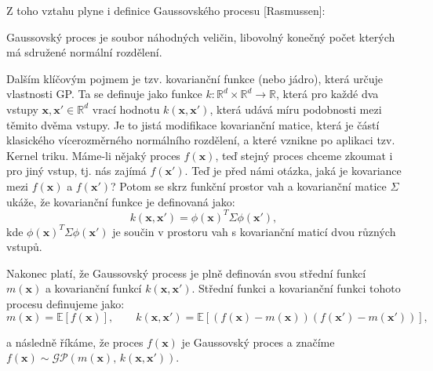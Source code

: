 Z toho vztahu plyne i definice Gaussovského procesu [Rasmussen]:
\begin{definition}
  Gaussovský proces je soubor náhodných veličin, libovolný konečný počet kterých má sdružené normální rozdělení.
\end{definition}

Dalším klíčovým pojmem je tzv. kovarianční funkce (nebo jádro), která určuje vlastnosti GP.
Ta se definuje jako funkce $k: \mathbb{R}^d \times \mathbb{R}^d \to \mathbb{R}$, která pro každé dva vstupy $\mathbf{x}, \mathbf{x'} \in \mathbb{R}^d$ vrací hodnotu $k(\mathbf{x}, \mathbf{x'})$, která udává míru podobnosti mezi těmito dvěma vstupy.
Je to jistá modifikace kovarianční matice, která je částí klasického vícerozměrného normálního rozdělení, a které vznikne po aplikaci tzv. Kernel triku.
Máme-li nějaký proces $f(\mathbf{x})$, teď stejný proces chceme zkoumat i pro jiný vstup, tj. nás zajímá $f(\mathbf{x'})$.
Teď je před námi otázka, jaká je kovariance mezi $f(\mathbf{x})$ a $f(\mathbf{x'})$?
Potom se skrz funkční prostor vah a kovarianční matice $\Sigma$ ukáže, že kovarianční funkce je definovaná jako:
\begin{equation}
  k(\mathbf{x}, \mathbf{x'}) = \phi(\mathbf{x})^T \Sigma \phi(\mathbf{x'}),
\end{equation}
kde $\phi(\mathbf{x})^T \Sigma \phi(\mathbf{x'})$ je součin v prostoru vah s kovarianční maticí dvou různých vstupů.

Nakonec platí, že Gaussovský process je plně definován svou střední funkcí $m(\mathbf{x})$ a kovarianční funkcí $k(\mathbf{x}, \mathbf{x'})$.
Střední funkci a kovarianční funkci tohoto procesu definujeme jako:
\begin{equation}
  m(\mathbf{x}) = \mathbb{E}[f(\mathbf{x})],\qquad
  k(\mathbf{x}, \mathbf{x'}) = \mathbb{E}[(f(\mathbf{x}) - m(\mathbf{x}))(f(\mathbf{x'}) - m(\mathbf{x'}))],
\end{equation}

a následně říkáme, že proces $f(\mathbf{x})$ je Gaussovský proces a značíme $f(\mathbf{x}) \sim \mathcal{GP}(m(\mathbf{x}),\, k(\mathbf{x}, \mathbf{x'}))$.
\par

